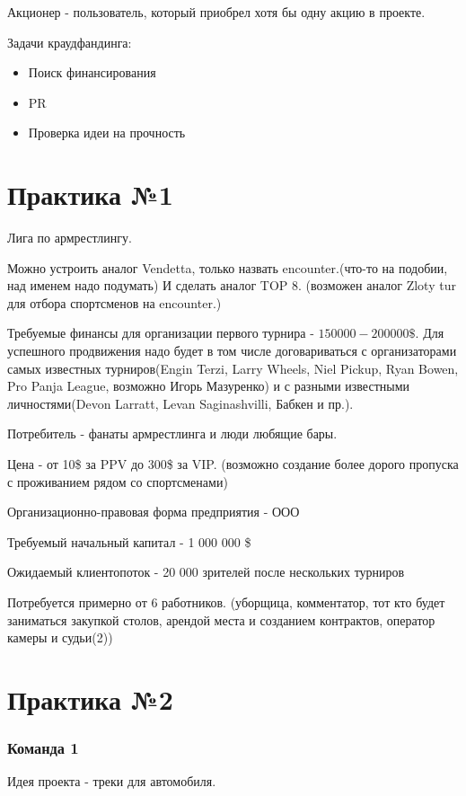 \documentclass[a4paper, 12pt]{article}
\begin{document}
	Акционер - пользователь, который приобрел хотя бы одну акцию в проекте.
	
	Задачи краудфандинга:
	\begin{itemize}
		\item Поиск финансирования
		\item PR
		\item Проверка идеи на прочность
	\end{itemize}
	
	\part*{Практика №1}
	
	Лига по армрестлингу. 
	
	Можно устроить аналог Vendetta, только назвать encounter.(что-то на подобии, над именем надо подумать) И сделать аналог TOP 8. (возможен аналог Zloty tur для отбора спортсменов на encounter.)
	
	Требуемые финансы для организации первого турнира - $150 000 - 200 000 \$$. Для успешного продвижения надо будет в том числе договариваться с организаторами самых известных турниров(Engin Terzi, Larry Wheels, Niel Pickup, Ryan Bowen, Pro Panja League, возможно Игорь Мазуренко) и с разными известными личностями(Devon Larratt, Levan Saginashvilli, Бабкен и пр.). 
	
	Потребитель - фанаты армрестлинга и люди любящие бары.
	
	Цена - от 10\$ за PPV до 300\$ за VIP. (возможно создание более дорого пропуска с проживанием рядом со спортсменами)
	
	Организационно-правовая форма предприятия - ООО
	
	Требуемый начальный капитал - 1 000 000 \$
	
	Ожидаемый клиентопоток - 20 000 зрителей после нескольких турниров
	
	Потребуется примерно от 6 работников. (уборщица, комментатор, тот кто будет заниматься закупкой столов, арендой места и созданием контрактов, оператор камеры и судьи(2))
	
	\part*{Практика №2}
	
	\section*{Команда 1}
	Идея проекта - треки для автомобиля.
	
\end{document}
